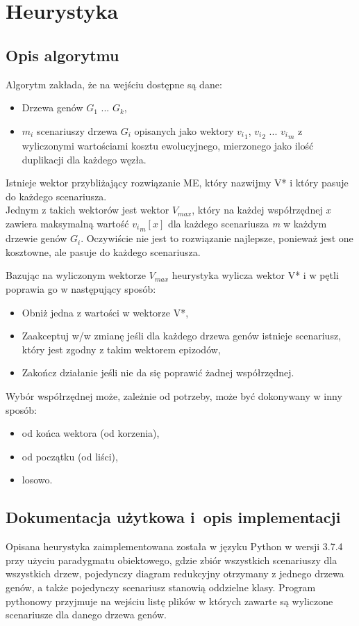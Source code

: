 \documentclass[licencjacka]{pracamgr}
\begin{document}
\chapter{Heurystyka}\label{r:heurystyka}

\section{Opis algorytmu}

Algorytm zakłada, że na wejściu dostępne są dane:
\begin{itemize}
\item Drzewa genów $G_1$ ... $G_k$,
\item $m_i$ scenariuszy drzewa $G_i$ opisanych jako wektory ${v_i}_1$, ${v_i}_2$ ... ${v_i}_m$ z wyliczonymi wartościami kosztu ewolucyjnego, mierzonego jako ilość duplikacji dla każdego węzła.
\end{itemize}
Istnieje wektor przybliżający rozwiązanie ME, który nazwijmy V* i który pasuje do każdego scenariusza. \\
Jednym z takich wektorów jest wektor $V_{max}$, który na każdej współrzędnej \textit{x} zawiera maksymalną wartość ${{v_i}_m}[x]$ dla każdego scenariusza \textit{m} w każdym drzewie genów $G_i$. Oczywiście nie jest to rozwiązanie najlepsze, ponieważ jest one kosztowne, ale pasuje do każdego scenariusza.

Bazując na wyliczonym wektorze $V_{max}$ heurystyka wylicza wektor V* i w pętli poprawia go w następujący sposób:
\begin{itemize}
\item Obniż jedna z wartości w wektorze V*,
\item Zaakceptuj w/w zmianę jeśli dla każdego drzewa genów istnieje scenariusz, który jest zgodny z takim wektorem epizodów,
\item Zakończ działanie jeśli nie da się poprawić żadnej współrzędnej.
\end{itemize}
Wybór współrzędnej może, zależnie od potrzeby, może być dokonywany w inny sposób:
\begin{itemize}
\item od końca wektora (od korzenia),
\item od początku (od liści),
\item losowo.
\end{itemize}

\section{Dokumentacja użytkowa i~opis implementacji}\label{r:impl}
Opisana heurystyka zaimplementowana została w języku Python w wersji 3.7.4 przy użyciu paradygmatu obiektowego, gdzie zbiór wszystkich scenariuszy dla wszystkich drzew, pojedynczy diagram redukcyjny otrzymany z jednego drzewa genów, a także pojedynczy scenariusz stanowią oddzielne klasy. Program pythonowy przyjmuje na wejściu listę plików w których zawarte są wyliczone scenariusze dla danego drzewa genów.
\end{document}
